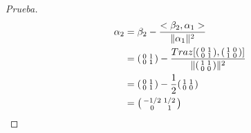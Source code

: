 \documentclass[12pt]{article}
\newenvironment{xmat}
  {\left(\begin{smallmatrix}}
  {\end{smallmatrix}\right)}
\begin{document}
\begin{proof}[Prueba]
\begin{align*}
\alpha_{2} & = \beta_{2} - \frac{<\beta_{2}, \alpha_{1}>}{\|\alpha_{1}\|^{2}}\\
& = \begin{xmat}0 & 1\\0 & 1\end{xmat} - 
	\frac{Traz[\begin{xmat}0 & 1\\0 & 1\end{xmat}, \begin{xmat}1 & 0\\1 & 0\end{xmat}]}
		 {\|\begin{xmat}1 & 1\\0 & 0\end{xmat}\|^{2}}\\
& = \begin{xmat}0 & 1\\0 & 1\end{xmat} - \frac{1}{2}\begin{xmat}1 & 1\\0 & 0\end{xmat}\\
& = \begin{xmat}-1/2 & 1/2\\0 & 1\end{xmat}
\end{align*}


\end{proof}
\end{document}
